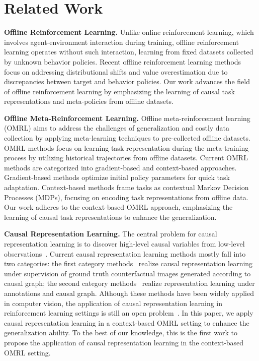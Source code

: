 \section{Related Work}
\noindent\textbf{Offline Reinforcement Learning.} Unlike online reinforcement learning, which involves agent-environment interaction during training, offline reinforcement learning operates without such interaction, learning from fixed datasets collected by unknown behavior policies. Recent offline reinforcement learning methods~\cite{levine2020offline,nair2020awac,zhang2024perspective} focus on addressing distributional shifts and value overestimation due to discrepancies between target and behavior policies. Our work advances the field of offline reinforcement learning by emphasizing the learning of causal task representations and meta-policies from offline datasets.


\noindent\textbf{Offline Meta-Reinforcement Learning.} Offline meta-reinforcement learning (OMRL) aims to address the challenges of generalization and costly data collection by applying meta-learning techniques to pre-collected offline datasets. OMRL methods focus on learning task representation during the meta-training process by utilizing historical trajectories from offline datasets. 
Current OMRL methods are categorized into gradient-based and context-based approaches. Gradient-based methods \cite{finn2017model,gupta2018meta,rengarajan2022enhanced} optimize initial policy parameters for quick task adaptation. Context-based methods \cite{rakelly2019efficient,li2020focal,wang2023offline} frame tasks as contextual Markov Decision Processes (MDPs), focusing on encoding task representations from offline data.
Our work adheres to the context-based OMRL approach, emphasizing the learning of causal task representations to enhance the generalization.


\noindent\textbf{Causal Representation Learning.} 
The central problem for causal representation learning is to discover high-level causal variables from low-level observations~\cite{scholkopf2021toward}. Current causal representation learning methods mostly fall into two categories: the first category methods~\cite{ahuja2022weakly,brehmer2022weakly,gresele2021independent,lachapelle2022disentanglement} realize causal representation learning under supervision of ground truth counterfactual images generated according to causal graph; the second category methods~\cite{kocaoglu2017causalgan,yang2020causalvae,shen2022weakly,reddy2022causally} realize representation learning under annotations and causal graph. Although these methods have been widely applied in computer vision, the application of causal representation learning in reinforcement learning settings is still an open problem~\cite{seitzer2021causal,ding2022generalizing,lampinen2024passive}. In this paper, we apply causal representation learning in a context-based OMRL setting to enhance the generalization ability. To the best of our knowledge, this is the first work to propose the application of causal representation learning in the context-based OMRL setting.


